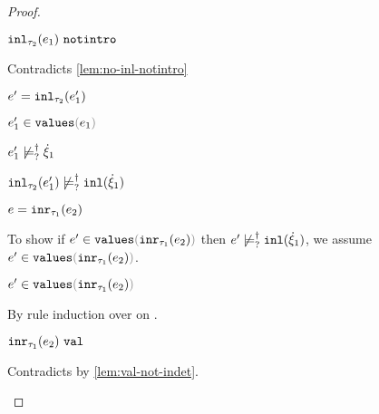 \begin{proof}
\begin{byCases}
\begin{byCases}
\begin{byCases}
\begin{byCases}
            \item[\text{(\ref{rule:IVIndet})}] 
            \begin{pfsteps*}
            \item $\mathtt{inl}_{\tau_2}({e_1}) ~\mathtt{notintro}$ 
            \end{pfsteps*} 
            Contradicts \autoref{lem:no-inl-notintro}
            \item[\text{(\ref{rule:IVInl})}] 
            \begin{pfsteps*}
            \item $e'=\mathtt{inl}_{\tau_2}({e_1'})$ 
            \item $\inValues{e_1'}{e_1}$  
            \item $e_1' \not\models_{?}^{\dag} \dot{\xi}_1$  
            \item $\mathtt{inl}_{\tau_2}({e_1'}) \not\models_{?}^{\dag} \mathtt{inl}(\dot{\xi}_1)$ 
            \end{pfsteps*} 
          \end{byCases}
        \end{byCases}
        \item[\text{(\ref{rule:IInr})}] 
        \begin{pfsteps*}
        \item $e=\mathtt{inr}_{\tau_1}({e_2})$ 
        \end{pfsteps*}
        To show if $\inValues{e'}{\hinr{\tau_1}{e_2}}$ then $e' \not\models_{?}^{\dag} \mathtt{inl}(\dot{\xi}_1)$, we assume $\inValues{e'}{\hinr{\tau_1}{e_2}}$.
        \begin{pfsteps*}
        \item $\inValues{e'}{\hinr{\tau_1}{e_2}}$  
        \end{pfsteps*}
        By rule induction over  on .
        \begin{byCases}
          \item[\text{(\ref{rule:IVVal})}]
          \begin{pfsteps*}
          \item $\mathtt{inr}_{\tau_1}({e_2}) ~\mathtt{val}$ 
          \end{pfsteps*} 
          Contradicts  by \autoref{lem:val-not-indet}.

\end{byCases}
\end{byCases}
\end{byCases}
\end{proof}
